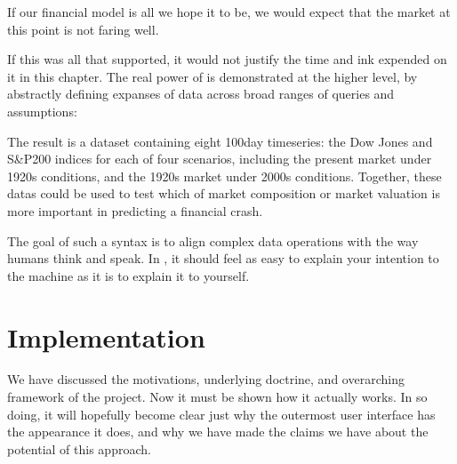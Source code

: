 \documentclass[letterpaper,10pt,english]{jupyterBook}
\begin{document}
\begin{sphinxVerbatim}[commandchars=\\\{\}]
\end{sphinxVerbatim}

\sphinxAtStartPar
If our financial model is all we hope it to be, we would expect that the market at this point is not faring well.

\sphinxAtStartPar
If this was all that  supported, it would not justify the time and ink expended on it in this chapter. The real power of  is demonstrated at the higher level, by abstractly defining expanses of data across broad ranges of queries and assumptions:

\begin{sphinxVerbatim}[commandchars=\\\{\}]
  \PYG{p}{[}
\PYG{g+go}{    ]}
\end{sphinxVerbatim}

\sphinxAtStartPar
The result is a dataset containing eight 100\sphinxhyphen{}day timeseries: the Dow Jones and S\&P200 indices for each of four scenarios, including the present market under 1920s conditions, and the 1920s market under 2000s conditions. Together, these datas could be used to test which of market composition or market valuation is more important in predicting a financial crash.

\sphinxAtStartPar
The goal of such a syntax is to align complex data operations with the way humans think and speak. In , it should feel as easy to explain your intention to the machine as it is to explain it to yourself.


\section{Implementation}
\label{\detokenize{content/chapter_03_everest/implementation:implementation}}\label{\detokenize{content/chapter_03_everest/implementation::doc}}
\sphinxAtStartPar
We have discussed the motivations, underlying doctrine, and overarching framework of the  project. Now it must be shown how it actually works. In so doing, it will hopefully become clear just why the outermost user interface has the appearance it does, and why we have made the claims we have about the potential of this approach.
\end{document}
